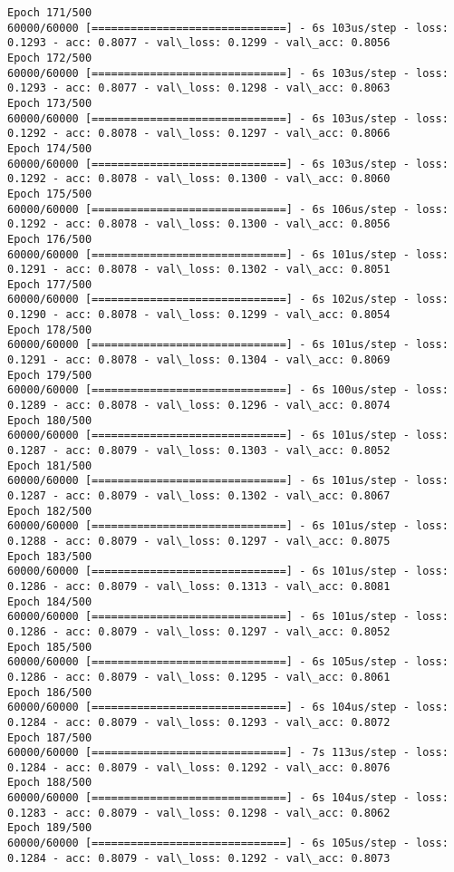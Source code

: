 \documentclass[11pt]{article}
\begin{document}
\begin{Verbatim}[commandchars=\\\{\}]
Epoch 171/500
60000/60000 [==============================] - 6s 103us/step - loss: 0.1293 - acc: 0.8077 - val\_loss: 0.1299 - val\_acc: 0.8056
Epoch 172/500
60000/60000 [==============================] - 6s 103us/step - loss: 0.1293 - acc: 0.8077 - val\_loss: 0.1298 - val\_acc: 0.8063
Epoch 173/500
60000/60000 [==============================] - 6s 103us/step - loss: 0.1292 - acc: 0.8078 - val\_loss: 0.1297 - val\_acc: 0.8066
Epoch 174/500
60000/60000 [==============================] - 6s 103us/step - loss: 0.1292 - acc: 0.8078 - val\_loss: 0.1300 - val\_acc: 0.8060
Epoch 175/500
60000/60000 [==============================] - 6s 106us/step - loss: 0.1292 - acc: 0.8078 - val\_loss: 0.1300 - val\_acc: 0.8056
Epoch 176/500
60000/60000 [==============================] - 6s 101us/step - loss: 0.1291 - acc: 0.8078 - val\_loss: 0.1302 - val\_acc: 0.8051
Epoch 177/500
60000/60000 [==============================] - 6s 102us/step - loss: 0.1290 - acc: 0.8078 - val\_loss: 0.1299 - val\_acc: 0.8054
Epoch 178/500
60000/60000 [==============================] - 6s 101us/step - loss: 0.1291 - acc: 0.8078 - val\_loss: 0.1304 - val\_acc: 0.8069
Epoch 179/500
60000/60000 [==============================] - 6s 100us/step - loss: 0.1289 - acc: 0.8078 - val\_loss: 0.1296 - val\_acc: 0.8074
Epoch 180/500
60000/60000 [==============================] - 6s 101us/step - loss: 0.1287 - acc: 0.8079 - val\_loss: 0.1303 - val\_acc: 0.8052
Epoch 181/500
60000/60000 [==============================] - 6s 101us/step - loss: 0.1287 - acc: 0.8079 - val\_loss: 0.1302 - val\_acc: 0.8067
Epoch 182/500
60000/60000 [==============================] - 6s 101us/step - loss: 0.1288 - acc: 0.8079 - val\_loss: 0.1297 - val\_acc: 0.8075
Epoch 183/500
60000/60000 [==============================] - 6s 101us/step - loss: 0.1286 - acc: 0.8079 - val\_loss: 0.1313 - val\_acc: 0.8081
Epoch 184/500
60000/60000 [==============================] - 6s 101us/step - loss: 0.1286 - acc: 0.8079 - val\_loss: 0.1297 - val\_acc: 0.8052
Epoch 185/500
60000/60000 [==============================] - 6s 105us/step - loss: 0.1286 - acc: 0.8079 - val\_loss: 0.1295 - val\_acc: 0.8061
Epoch 186/500
60000/60000 [==============================] - 6s 104us/step - loss: 0.1284 - acc: 0.8079 - val\_loss: 0.1293 - val\_acc: 0.8072
Epoch 187/500
60000/60000 [==============================] - 7s 113us/step - loss: 0.1284 - acc: 0.8079 - val\_loss: 0.1292 - val\_acc: 0.8076
Epoch 188/500
60000/60000 [==============================] - 6s 104us/step - loss: 0.1283 - acc: 0.8079 - val\_loss: 0.1298 - val\_acc: 0.8062
Epoch 189/500
60000/60000 [==============================] - 6s 105us/step - loss: 0.1284 - acc: 0.8079 - val\_loss: 0.1292 - val\_acc: 0.8073

\end{Verbatim}
\end{document}
